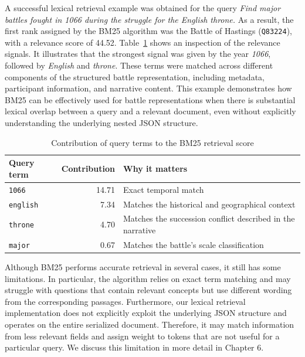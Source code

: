 A successful lexical retrieval example was obtained for the query \textit{Find major battles fought in 1066 during the struggle for the English throne.} As a result, the first rank assigned by the BM25 algorithm was the Battle of Hastings (\texttt{Q83224}), with a relevance score of 44.52. Table~\ref{tab:bm25_term_contributions} shows an inspection of the relevance signals. It illustrates that the strongest signal was given by the year \textit{1066}, followed by \textit{English} and \textit{throne}. These terms were matched across different components of the structured battle representation, including metadata, participant information, and narrative content. This example demonstrates how BM25 can be effectively used for battle representations when there is substantial lexical overlap between a query and a relevant document, even without explicitly understanding the underlying nested JSON structure.
\begin{table}[htbp]
    \centering
    \caption{Contribution of query terms to the BM25 retrieval score}
    \label{tab:bm25_term_contributions}

    \small
    \renewcommand{\arraystretch}{1.3}
    \setlength{\tabcolsep}{6pt}

    \begin{tabularx}{\textwidth}{
        l
        r
        >{\raggedright\arraybackslash}X
    }
        \toprule
        \textbf{Query term} &
        \textbf{Contribution} &
        \textbf{Why it matters} \\
        \midrule

        \texttt{1066} & 14.71 &
        Exact temporal match \\

        \texttt{english} & 7.34 &
        Matches the historical and geographical context \\

        \texttt{throne} & 4.70 &
        Matches the succession conflict described in the narrative \\

        \texttt{major} & 0.67 &
        Matches the battle's scale classification \\

        \bottomrule
    \end{tabularx}
\end{table}

Although BM25 performs accurate retrieval in several cases, it still has some limitations. In particular, the algorithm relies on exact term matching and may struggle with questions that contain relevant concepts but use different wording from the corresponding passages. Furthermore, our lexical retrieval implementation does not explicitly exploit the underlying JSON structure and operates on the entire serialized document. Therefore, it may match information from less relevant fields and assign weight to tokens that are not useful for a particular query. We discuss this limitation in more detail in Chapter 6.

